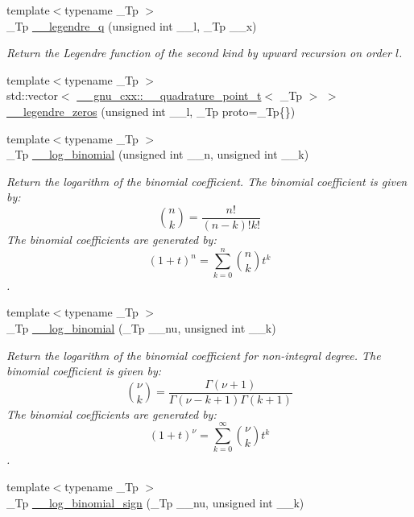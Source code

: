 \begin{DoxyCompactItemize}
{\footnotesize template$<$typename \+\_\+\+Tp $>$ }\\\+\_\+\+Tp \hyperlink{namespacestd_1_1____detail_a0643760e0d1701df4db880b2ad969055}{\+\_\+\+\_\+legendre\+\_\+q} (unsigned int \+\_\+\+\_\+l, \+\_\+\+Tp \+\_\+\+\_\+x)
\begin{DoxyCompactList}\small\item\em Return the Legendre function of the second kind by upward recursion on order $ l $. \end{DoxyCompactList}\item 
{\footnotesize template$<$typename \+\_\+\+Tp $>$ }\\std\+::vector$<$ \hyperlink{struct____gnu__cxx_1_1____quadrature__point__t}{\+\_\+\+\_\+gnu\+\_\+cxx\+::\+\_\+\+\_\+quadrature\+\_\+point\+\_\+t}$<$ \+\_\+\+Tp $>$ $>$ \hyperlink{namespacestd_1_1____detail_a9d53ac0fd39232190e7564fa067a878d}{\+\_\+\+\_\+legendre\+\_\+zeros} (unsigned int \+\_\+\+\_\+l, \+\_\+\+Tp proto=\+\_\+\+Tp\{\})
\item 
{\footnotesize template$<$typename \+\_\+\+Tp $>$ }\\\+\_\+\+Tp \hyperlink{namespacestd_1_1____detail_a087d65f98ba6a6709b4d62fa32445e59}{\+\_\+\+\_\+log\+\_\+binomial} (unsigned int \+\_\+\+\_\+n, unsigned int \+\_\+\+\_\+k)
\begin{DoxyCompactList}\small\item\em Return the logarithm of the binomial coefficient. The binomial coefficient is given by\+: \[ \binom{n}{k} = \frac{n!}{(n-k)! k!} \] The binomial coefficients are generated by\+: \[ \left(1 + t\right)^n = \sum_{k=0}^n \binom{n}{k} t^k \]. \end{DoxyCompactList}\item 
{\footnotesize template$<$typename \+\_\+\+Tp $>$ }\\\+\_\+\+Tp \hyperlink{namespacestd_1_1____detail_af8613458310f575d1a1b162553abe4aa}{\+\_\+\+\_\+log\+\_\+binomial} (\+\_\+\+Tp \+\_\+\+\_\+nu, unsigned int \+\_\+\+\_\+k)
\begin{DoxyCompactList}\small\item\em Return the logarithm of the binomial coefficient for non-\/integral degree. The binomial coefficient is given by\+: \[ \binom{\nu}{k} = \frac{\Gamma(\nu+1)}{\Gamma(\nu-k+1) \Gamma(k+1)} \] The binomial coefficients are generated by\+: \[ \left(1 + t\right)^\nu = \sum_{k=0}^\infty \binom{\nu}{k} t^k \]. \end{DoxyCompactList}\item 
{\footnotesize template$<$typename \+\_\+\+Tp $>$ }\\\+\_\+\+Tp \hyperlink{namespacestd_1_1____detail_aa89a8a5ced6325e1d64782f84e4ad95d}{\+\_\+\+\_\+log\+\_\+binomial\+\_\+sign} (\+\_\+\+Tp \+\_\+\+\_\+nu, unsigned int \+\_\+\+\_\+k)

\end{DoxyCompactItemize}
